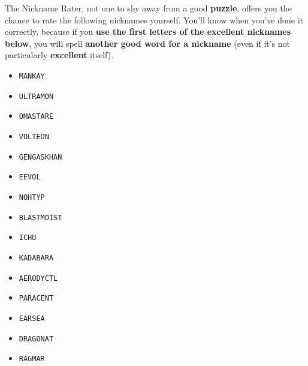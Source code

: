 The Nickname Rater, not one to shy away from a good \textbf{puzzle}, offers you
the chance to rate the following \mappMobidot{} nicknames yourself.  You'll know
when you've done it correctly, because if you \textbf{use the first letters of
  the excellent nicknames below}, you will spell \textbf{another good word for a
  nickname} (even if it's not particularly \textbf{excellent} itself).


\begin{multicols}{3}
  \begin{itemize}
    \item \texttt{MANKAY} %
    \item \texttt{ULTRAMON} %
    \item \texttt{OMASTARE} %
    \item \texttt{VOLTEON} %
    \item \texttt{GENGASKHAN} %
    \item \texttt{EEVOL} %
    \item \texttt{NOHTYP} %
    \item \texttt{BLASTMOIST} %
    \item \texttt{ICHU} %
    \item \texttt{KADABARA} %
    \item \texttt{AERODYCTL} %
    \item \texttt{PARACENT} %
    \item \texttt{EARSEA} %
    \item \texttt{DRAGONAT} %
    \item \texttt{RAGMAR} %
  \end{itemize}
\end{multicols}


